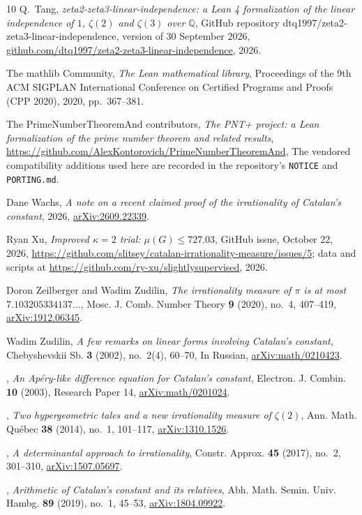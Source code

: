 \documentclass[11pt]{amsart}
\theoremstyle{definition}
\theoremstyle{remark}
\numberwithin{equation}{section}
\begin{document}
\begin{thebibliography}{10}
Q.~Tang, \emph{zeta2-zeta3-linear-independence: a {L}ean 4 formalization of the
  linear independence of {$1$}, {$\zeta(2)$} and {$\zeta(3)$} over
  {$\mathbb{Q}$}}, GitHub repository dtq1997/zeta2-zeta3-linear-independence,
  version of 30 September 2026,
  \href{https://github.com/dtq1997/zeta2-zeta3-linear-independence}{github.com/dtq1997/zeta2-zeta3-linear-independence},
  2026.

{The mathlib Community}, \emph{The {L}ean mathematical library}, Proceedings of
  the 9th ACM SIGPLAN International Conference on Certified Programs and Proofs
  (CPP 2020), 2020, pp.~367--381.

{The PrimeNumberTheoremAnd contributors}, \emph{The {PNT+} project: a {L}ean
  formalization of the prime number theorem and related results},
  \url{https://github.com/AlexKontorovich/PrimeNumberTheoremAnd}, The vendored
  compatibility additions used here are recorded in the repository's
  \texttt{NOTICE} and \texttt{PORTING.md}.

Dane Wachs, \emph{A note on a recent claimed proof of the irrationality of
  {C}atalan's constant}, 2026,
  \href{https://arxiv.org/abs/2609.22339}{arXiv:2609.22339}.

Ryan Xu, \emph{Improved {$\kappa=2$} trial: {$\mu(G)\le727.03$}}, GitHub issue,
  October 22, 2026,
  \url{https://github.com/slitsey/catalan-irrationality-measure/issues/5}; data
  and scripts at \url{https://github.com/ry-xu/slightlysupervised}, 2026.

Doron Zeilberger and Wadim Zudilin, \emph{The irrationality measure of {$\pi$}
  is at most {$7.103205334137\ldots$}}, Mosc. J. Comb. Number Theory \textbf{9}
  (2020), no.~4, 407--419,
  \href{https://arxiv.org/abs/1912.06345}{arXiv:1912.06345}.

Wadim Zudilin, \emph{A few remarks on linear forms involving {C}atalan's
  constant}, Chebyshevskii Sb. \textbf{3} (2002), no.~2(4), 60--70, In Russian,
  \href{https://arxiv.org/abs/math/0210423}{arXiv:math/0210423}.

\bysame, \emph{An {A}p\'ery-like difference equation for {C}atalan's constant},
  Electron. J. Combin. \textbf{10} (2003), Research Paper 14,
  \href{https://arxiv.org/abs/math/0201024}{arXiv:math/0201024}.

\bysame, \emph{Two hypergeometric tales and a new irrationality measure of
  {$\zeta(2)$}}, Ann. Math. Qu\'ebec \textbf{38} (2014), no.~1, 101--117,
  \href{https://arxiv.org/abs/1310.1526}{arXiv:1310.1526}.

\bysame, \emph{A determinantal approach to irrationality}, Constr. Approx.
  \textbf{45} (2017), no.~2, 301--310,
  \href{https://arxiv.org/abs/1507.05697}{arXiv:1507.05697}.

\bysame, \emph{Arithmetic of {C}atalan's constant and its relatives}, Abh.
  Math. Semin. Univ. Hambg. \textbf{89} (2019), no.~1, 45--53,
  \href{https://arxiv.org/abs/1804.09922}{arXiv:1804.09922}.

\end{thebibliography}
\end{document}
